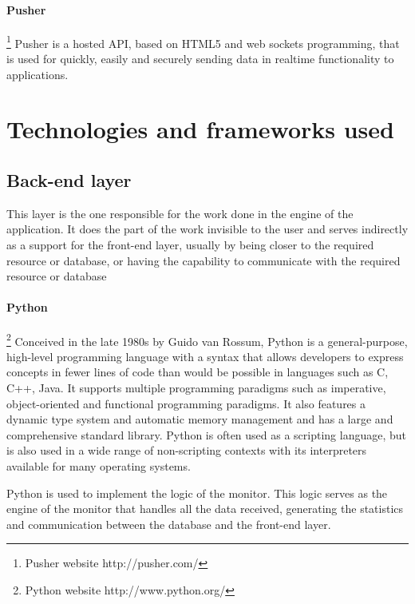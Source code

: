 \paragraph{Pusher}\footnote{Pusher website http://pusher.com/}
Pusher is a hosted API, based on HTML5 and web sockets programming, that is used for quickly, easily and securely sending data in realtime functionality to applications.

\newpage

\section{Technologies and frameworks used}

\subsection{Back-end layer}
This layer is the one responsible for the work done in the engine of the application. It does the part of the work invisible to the user and serves indirectly as a support for the front-end layer, usually by being closer to the required resource or database, or having the capability to communicate with the required resource or database

\paragraph{Python}\footnote{Python website http://www.python.org/}
Conceived in the late 1980s by Guido van Rossum, Python is a general-purpose, high-level programming language with a syntax that allows developers to express concepts in fewer lines of code than would be possible in languages such as C, C++, Java. It supports multiple programming paradigms such as imperative, object-oriented and functional programming paradigms. It also features a dynamic type system and automatic memory management and has a large and comprehensive standard library. Python is often used as a scripting language, but is also used in a wide range of non-scripting contexts with its interpreters available for many operating systems.

Python is used to implement the logic of the monitor. This logic serves as the engine of the monitor that handles all the data received, generating the statistics and communication between the database and the front-end layer.

